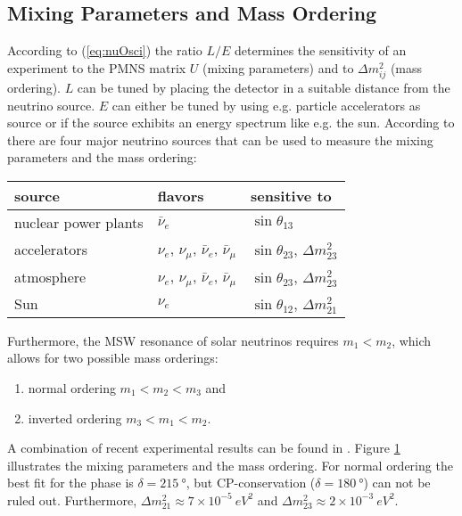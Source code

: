 \subsection{Mixing Parameters and Mass Ordering}
\begin{figure}[t]
 \label{fig:mixingParams}
\end{figure}
According to (\ref{eq:nuOsci}) the ratio $L/E$ determines the sensitivity of an experiment to the PMNS matrix $U$ (mixing parameters) and to $\Delta m^2_{ij}$ (mass ordering). $L$ can be tuned by placing the detector in a suitable distance from the neutrino source. $E$ can either be tuned by using e.g. particle accelerators as source or if the source exhibits an energy spectrum like e.g. the sun. According to \cite{zuber2011neutrino} there are four major neutrino sources that can be used to measure the mixing parameters and the mass ordering:
\begin{center}
    \begin{tabular}{lll}
    \toprule
         source & flavors & sensitive to \\
         \hline
         nuclear power plants & $\bar{\nu}_e$ & $\sin\theta_{13}$ \\
         accelerators & $\nu_e$, $\nu_\mu$, $\bar{\nu}_e$, $\bar{\nu}_\mu$ & $\sin\theta_{23}$, $\Delta m^2_{23}$ \\
         atmosphere & $\nu_e$, $\nu_\mu$, $\bar{\nu}_e$, $\bar{\nu}_\mu$ & $\sin\theta_{23}$, $\Delta m^2_{23}$ \\
         Sun & $\nu_{e}$ & $\sin\theta_{12}$, $\Delta m^2_{21}$ \\
    \bottomrule
    \end{tabular}
\end{center}
Furthermore, the MSW resonance of solar neutrinos requires $m_1 < m_2$, which allows for two possible mass orderings:
\begin{enumerate}
    \item normal ordering $m_1 < m_2 < m_3$ and
    \item inverted ordering $m_3 < m_1 < m_2$.
\end{enumerate}
A combination of recent experimental results can be found in \cite{Esteban2019}. Figure \ref{fig:mixingParams} illustrates the mixing parameters and the mass ordering. For normal ordering the best fit for the phase is $\delta=\SI{215}{\degree}$, but CP-conservation ($\delta=\SI{180}{\degree}$) can not be ruled out. Furthermore, $\Delta m^2_{21} \approx 7 \times 10^{-5} \SI{}{eV^2}$ and $\Delta m^2_{23} \approx 2 \times 10^{-3} \SI{}{eV^2}$.

